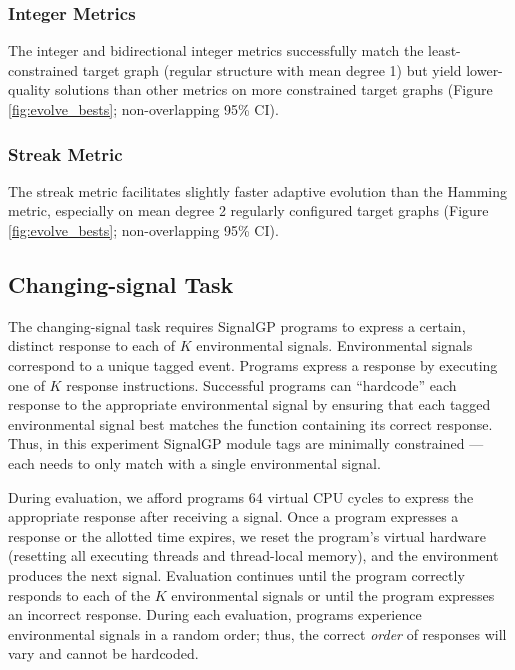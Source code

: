 \subsubsection{Integer Metrics}

The integer and bidirectional integer metrics successfully match the least-constrained target graph (regular structure with mean degree 1) but yield lower-quality solutions than other metrics on more constrained target graphs (Figure \ref{fig:evolve_bests}; non-overlapping 95\% CI).

\subsubsection{Streak Metric}

The streak metric facilitates slightly faster adaptive evolution than the Hamming metric, especially on mean degree 2 regularly configured target graphs (Figure \ref{fig:evolve_bests}; non-overlapping 95\% CI).


\subsection{Changing-signal Task} \label{sec:changing-signal}



The changing-signal task requires SignalGP programs to express a certain, distinct response to each of $K$ environmental signals.
Environmental signals correspond to a unique tagged event.
Programs express a response by executing one of $K$ response instructions.
Successful programs can ``hardcode'' each response to the appropriate environmental signal by ensuring that each tagged environmental signal best matches the function containing its correct response.
Thus, in this experiment SignalGP module tags are minimally constrained --- each needs to only match with a single environmental signal.

During evaluation, we afford programs 64 virtual CPU cycles to express the appropriate response after receiving a signal.
Once a program expresses a response or the allotted time expires, we reset the program's virtual hardware (resetting all executing threads and thread-local memory), and the environment produces the next signal.
Evaluation continues until the program correctly responds to each of the $K$ environmental signals or until the program expresses an incorrect response.
During each evaluation, programs experience environmental signals in a random order; thus, the correct \textit{order} of responses will vary and cannot be hardcoded.

